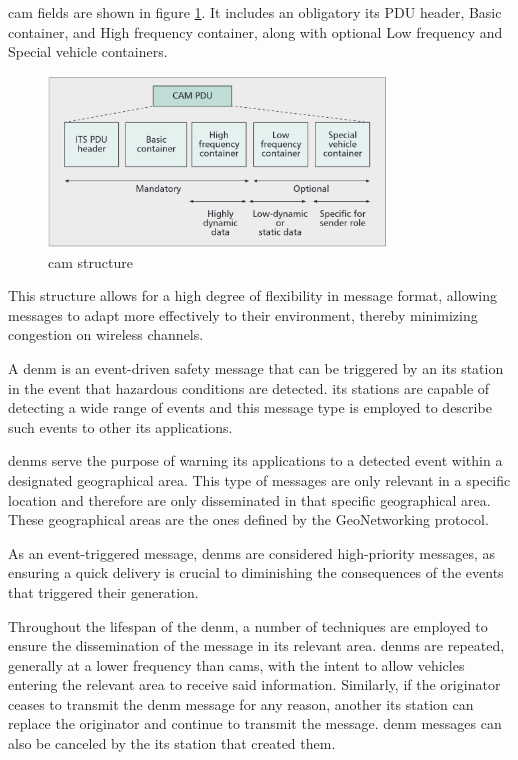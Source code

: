 \gls{cam} fields are shown in figure \ref{fig:cam_structure}. It includes an obligatory \gls{its} PDU header, Basic container, and High frequency container, along with optional Low frequency and Special vehicle containers.

\begin{figure}[htbp]
    \centering
    \includegraphics[width=0.8\textwidth]{Chapters/Figures/VANETs/cam_structure.png}
   	\caption{\gls{cam} structure~\cite{festag_cooperative_2014}}
   	\label{fig:cam_structure}
\end{figure}

This structure allows for a high degree of flexibility in message format, allowing messages to adapt more effectively to their environment, thereby minimizing congestion on wireless channels\cite{festag_cooperative_2014}.

A \gls{denm}\cite{etsi_intelligent_2019-1} is an event-driven safety message that can be triggered by an \gls{its} station in the event that hazardous conditions are detected. \gls{its} stations are capable of detecting a wide range of events and this message type is employed to describe such events to other \gls{its} applications. 

\glspl{denm} serve the purpose of warning \gls{its} applications to a detected event within a designated geographical area\cite{festag_cooperative_2014}. This type of messages are only relevant in a specific location and therefore are only disseminated in that specific geographical area. These geographical areas are the ones defined by the GeoNetworking protocol.

As an event-triggered message, \glspl{denm} are considered high-priority messages, as ensuring a quick delivery is crucial to diminishing the consequences of the events that triggered their generation\cite{al-sultan_comprehensive_2014}.

Throughout the lifespan of the \gls{denm}, a number of techniques are employed to ensure the dissemination of the message in its relevant area. \glspl{denm} are repeated, generally at a lower frequency than \glspl{cam}, with the intent to allow vehicles entering the relevant area to receive said information. Similarly, if the originator ceases to transmit the \gls{denm} message for any reason, another \gls{its} station can replace the originator and continue to transmit the message. \gls{denm} messages can also be canceled by the \gls{its} station that created them\cite{festag_cooperative_2014}.

